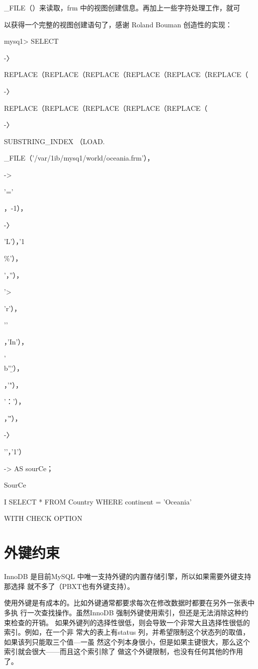 \_FILE（）来读取，frm 中的视图创建信息。再加上一些字符处理工作，就可

以获得一个完整的视图创建语句了，感谢 Roland Bouman 创造性的实现：

mysq1> SELECT

-〉

REPLACE（REPLACE（REPLACE（REPLACE（REPLACE（REPLACE（

-〉

REPLACE（REPLACE（REPLACE（REPLACE（REPLACE（

-〉

SUBSTRING\_INDEX （LOAD.

\_FILE（'/var/1ib/mysq1/world/oceania.frm'），

->

'\nsource='

，-1），

-〉

'L'），'1%

\%'），

'，''），

'>

'r'），

'\n'

，'In'），

'\\b''\b'），

，'"），

'：'），

，'\''），

-〉

'\0'，'1'）

-> AS sourCe；

SourCe

I SELECT * FROM Country WHERE continent = 'Oceania'

WITH CHECK OPTION

\section{外键约束}
InnoDB 是目前MySQL 中唯一支持外键的内置存储引擎，所以如果需要外键支持那选择
就不多了（PBXT也有外键支持）。

使用外键是有成本的。比如外键通常都要求每次在修改数据时都要在另外一张表中多执
行一次查找操作。虽然InnoDB 强制外键使用索引，但还是无法消除这种约束检查的开销。
如果外键列的选择性很低，则会导致一个非常大且选择性很低的索引。例如，在一个非
常大的表上有status 列，并希望限制这个状态列的取值，如果该列只能取三个值—一虽
然这个列本身很小，但是如果主键很大，那么这个索引就会很大——而且这个索引除了
做这个外键限制，也没有任何其他的作用了。

